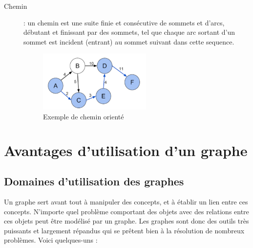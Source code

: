 \begin{description}
\item[Chemin] : un chemin est une suite finie et consécutive de sommets et d'arcs, débutant et finissant par des sommets, tel que chaque arc sortant d'un sommet est incident (entrant) au sommet suivant dans cette sequence.
\begin{figure}[h]
	\centering
	\includegraphics[width=0.55\textwidth]{img/cheminGraphe.png}
	\caption{Exemple de chemin orienté}
\end{figure}
\end{description}

	
	
\section{Avantages d'utilisation d'un graphe}
\subsection{Domaines d'utilisation des graphes}
Un graphe sert avant tout à manipuler des concepts, et à établir un lien entre ces concepts. N'importe quel problème comportant des objets avec des relations entre ces objets peut être modélisé par un graphe.
Les graphes sont donc des outils très puissants et largement répandus qui se prêtent bien à la résolution de nombreux problèmes. Voici quelques-uns :

